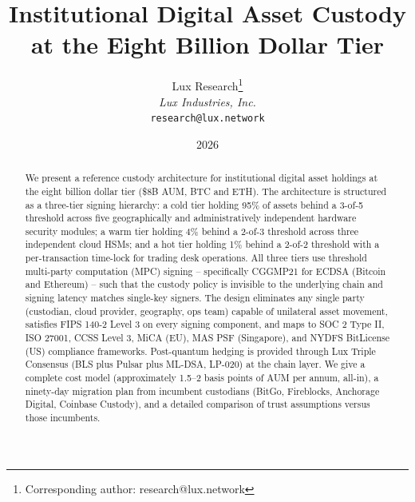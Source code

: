 \documentclass[11pt,a4paper]{article}
\title{Institutional Digital Asset Custody\\at the Eight Billion Dollar Tier}
\author{
Lux Research\thanks{Corresponding author: research@lux.network}\\
\textit{Lux Industries, Inc.}\\
\texttt{research@lux.network}
}
\date{2026}
\begin{document}
\luxcoverpage

\begin{abstract}
We present a reference custody architecture for institutional digital
asset holdings at the eight billion dollar tier (\$8B AUM, BTC and
ETH). The architecture is structured as a three-tier signing hierarchy:
a cold tier holding 95\% of assets behind a 3-of-5 threshold across
five geographically and administratively independent hardware security
modules; a warm tier holding 4\% behind a 2-of-3 threshold across
three independent cloud HSMs; and a hot tier holding 1\% behind a
2-of-2 threshold with a per-transaction time-lock for trading desk
operations. All three tiers use threshold multi-party computation
(MPC) signing -- specifically CGGMP21 for ECDSA (Bitcoin and
Ethereum) -- such that the custody policy is invisible to the
underlying chain and signing latency matches single-key signers.
The design eliminates any single party (custodian, cloud provider,
geography, ops team) capable of unilateral asset movement, satisfies
FIPS 140-2 Level 3 on every signing component, and maps to SOC 2 Type
II, ISO 27001, CCSS Level 3, MiCA (EU), MAS PSF (Singapore), and
NYDFS BitLicense (US) compliance frameworks. Post-quantum hedging is
provided through Lux Triple Consensus (BLS plus Pulsar plus ML-DSA,
LP-020) at the chain layer. We give a complete cost model
(approximately 1.5--2 basis points of AUM per annum, all-in), a
ninety-day migration plan from incumbent custodians (BitGo, Fireblocks,
Anchorage Digital, Coinbase Custody), and a detailed comparison of
trust assumptions versus those incumbents.
\end{abstract}

\tableofcontents
\newpage

















\end{document}
